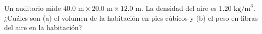 \item Un auditorio mide $40.0 \text{ m} \times 20.0 \text{ m} \times 12.0 \text{ m}$. La densidad del aire es $1.20 \text{ kg/m}^3$. ¿Cuáles son (a) el volumen de la habitación en pies cúbicos y (b) el peso en libras del aire en la habitación?
